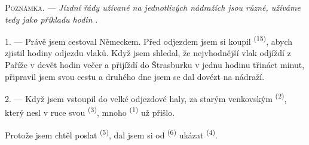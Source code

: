 %
%
%

\VUsaut{4.0mm}
\VUsaut{2.4mm}
\VUsaut{3.4mm}
\textsc{Poznámka.} --- \textit{Jízdní řády užívané na jednotlivých nádražích jsou
různé, užíváme tedy jako příkladu hodin} .

1. --- Právě jsem cestoval Německem. Před odjezdem jsem si koupil 
\textsuperscript{(15)}, abych zjistil hodiny odjezdu vlaků. Když jsem shledal, že
nejvhodnější vlak odjíždí z Paříže v devět hodin večer a přijíždí do Štrasburku v
jednu hodinu třináct minut, připravil jsem svou cestu a druhého dne jsem se dal dovézt
na nádraží.

2. --- Když jsem vstoupil do velké odjezdové haly, za starým venkovským
 \textsuperscript{(2)}, který nesl v ruce svou 
\textsuperscript{(3)}, mnoho  \textsuperscript{(1)} už přišlo.

Protože jsem chtěl poslat  \textsuperscript{(5)}, dal jsem si
od  \textsuperscript{(6)} ukázat 
\textsuperscript{(4)}.

